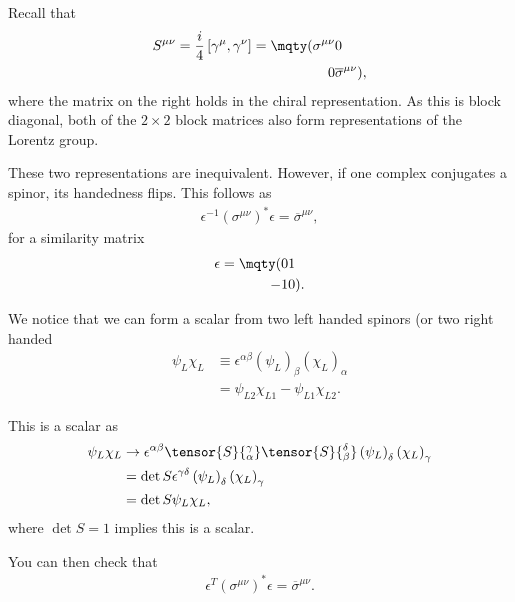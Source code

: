 
Recall that 
\begin{align}
    S^{\mu \nu} = \frac{i}{4} \left[ \gamma^{\mu}, \gamma^{\nu} \right] = \mqty( \sigma^{\mu \nu} & 0 \\ 0 & \overline{\sigma}^{\mu \nu} )
,\end{align}
where the matrix on the right holds in the chiral representation. As this is block diagonal, both of the $2 \times 2$ block matrices also form representations of the Lorentz group.

\begin{note}
    These two representations are inequivalent. However, if one complex conjugates a spinor, its handedness flips. This follows as
    \begin{align}
        \epsilon^{-1} \left( \sigma^{\mu \nu} \right)^{*} \epsilon = \overline{\sigma}^{\mu \nu}
    ,\end{align}
    for a similarity matrix
    \begin{align}
        \epsilon = \mqty( 0 & 1 \\ -1 & 0 )
    .\end{align}
\end{note}

We notice that we can form a scalar from two left handed spinors (or two right handed
\begin{align}
    \psi_L \chi_L &\equiv \epsilon^{\alpha \beta} \left( \psi_L \right)_\beta \left( \chi_L \right)_\alpha \\
    &= \psi_{L2} \chi_{L 1} - \psi_{L 1} \chi_{L 2}
.\end{align}

This is a scalar as
\begin{align}
    \psi_L \chi_L &\to \epsilon^{\alpha \beta} \tensor{S}{_{\alpha}^{\gamma}} \tensor{S}{_{\beta}^{\delta}} \left( \psi_L \right)_{\delta} \left( \chi_L \right)_{\gamma} \\
    &= \det S \epsilon^{\gamma \delta} \left( \psi_L \right)_\delta \left( \chi_L \right)_{\gamma}  \\
    &= \det S \psi_L \chi_L 
,\end{align}
where $\det S = 1$ implies this is a scalar.


You can then check that
\begin{align}
    \epsilon^{T} \left( \sigma^{\mu \nu} \right)^{*} \epsilon = \overline{\sigma}^{\mu \nu}
.\end{align}

